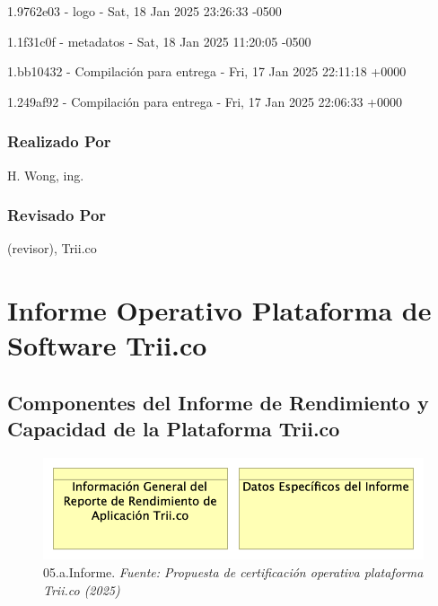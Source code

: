 \documentclass[
  paper=a4,
  ,captions=tableheading
]{scrartcl}
\renewenvironment{quote}{\begin{customblockquote}\list{}{\rightmargin=0em\leftmargin=0em}%
\item\relax\color{blockquote-text}\ignorespaces}{\unskip\unskip\endlist\end{customblockquote}}
\begin{document}
1.9762e03 - logo - Sat, 18 Jan 2025 23:26:33 -0500

1.1f31c0f - metadatos - Sat, 18 Jan 2025 11:20:05 -0500

1.bb10432 - Compilación para entrega - Fri, 17 Jan 2025 22:11:18 +0000

1.249af92 - Compilación para entrega - Fri, 17 Jan 2025 22:06:33 +0000

\subsubsection{Realizado Por}\label{sec:realizado-por}

H. Wong, ing.

\subsubsection{Revisado Por}\label{sec:revisado-por}

(revisor), Trii.co

\newpage

\section{Informe Operativo Plataforma de Software
Trii.co}\label{sec:informe-operativo-plataforma-de-software-trii.co}

\subsection{Componentes del Informe de Rendimiento y Capacidad de la
Plataforma
Trii.co}\label{sec:componentes-del-informe-de-rendimiento-y-capacidad-de-la-plataforma-trii.co}

\begin{quote}
\end{quote}

\begin{figure}
\centering
\includegraphics{images/05.a.Informe.png}
\caption{05.a.Informe. \emph{Fuente: Propuesta de certificación
operativa plataforma Trii.co
(2025)}}\label{fig:id-04abc8f16f354757a52791da825e4049}
\end{figure}
\end{document}
